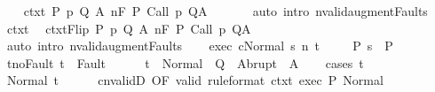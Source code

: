 \begin{isabellebody}
\ \ \isamarkupfalse%
\ ctxt{\isacharprime}{\isacharcolon}\ {\isachardoublequoteopen}{\isasymforall}{\isacharparenleft}P{\isacharcomma}\ p{\isacharcomma}\ Q{\isacharcomma}\ A{\isacharparenright}{\isasymin}{\isasymTheta}{\isachardot}\ {\isasymGamma}{\isasymTurnstile}n{\isacharcolon}\isactrlbsub {\isacharslash}F\isactrlesub \ P\ {\isacharparenleft}Call\ p{\isacharparenright}\ Q{\isacharcomma}A{\isachardoublequoteclose}\ \isanewline
\ \ \ \ \isamarkupfalse%
\ {\isacharparenleft}auto\ intro{\isacharcolon}\ nvalid{\isacharunderscore}augment{\isacharunderscore}Faults{\isacharparenright}\isanewline
\ \ \isamarkupfalse%
\ ctxt\ \isamarkupfalse%
\ ctxtFlip{\isacharcolon}\ {\isachardoublequoteopen}{\isasymforall}{\isacharparenleft}P{\isacharcomma}\ p{\isacharcomma}\ Q{\isacharcomma}\ A{\isacharparenright}{\isasymin}{\isasymTheta}{\isachardot}\ {\isasymGamma}{\isasymTurnstile}n{\isacharcolon}\isactrlbsub {\isacharslash}{\isacharminus}F\isactrlesub \ P\ {\isacharparenleft}Call\ p{\isacharparenright}\ Q{\isacharcomma}A{\isachardoublequoteclose}\ \isanewline
\ \ \ \ \isamarkupfalse%
\ {\isacharparenleft}auto\ intro{\isacharcolon}\ nvalid{\isacharunderscore}augment{\isacharunderscore}Faults{\isacharparenright}\isanewline
\ \ \isamarkupfalse%
\ exec{\isacharcolon}\ {\isachardoublequoteopen}{\isasymGamma}{\isasymturnstile}{\isasymlangle}c{\isacharcomma}Normal\ s{\isasymrangle}\ {\isacharequal}n{\isasymRightarrow}\ t{\isachardoublequoteclose}\ \isanewline
\ \ \isamarkupfalse%
\ P{\isacharcolon}\ {\isachardoublequoteopen}s\ {\isasymin}\ P{\isachardoublequoteclose}\ \isanewline
\ \ \isamarkupfalse%
\ t{\isacharunderscore}noFault{\isacharcolon}\ {\isachardoublequoteopen}t\ {\isasymnotin}\ Fault\ {\isacharbackquote}\ {\isacharbraceleft}{\isacharbraceright}{\isachardoublequoteclose}\isanewline
\ \ \isamarkupfalse%
\ {\isachardoublequoteopen}t\ {\isasymin}\ Normal\ {\isacharbackquote}\ Q\ {\isasymunion}\ Abrupt\ {\isacharbackquote}\ A{\isachardoublequoteclose}\isanewline
\ \ \isamarkupfalse%
\ {\isacharparenleft}cases\ t{\isacharparenright}\isanewline
\ \ \ \ \isamarkupfalse%
\ {\isacharparenleft}Normal\ t{\isacharprime}{\isacharparenright}\isanewline
\ \ \ \ \isamarkupfalse%
\ cnvalidD\ {\isacharbrackleft}OF\ valid\ {\isacharbrackleft}rule{\isacharunderscore}format{\isacharbrackright}\ ctxt{\isacharprime}\ exec\ P{\isacharbrackright}\ Normal\ \isanewline
\ \ \ \ \isamarkupfalse%

\end{isabellebody}
